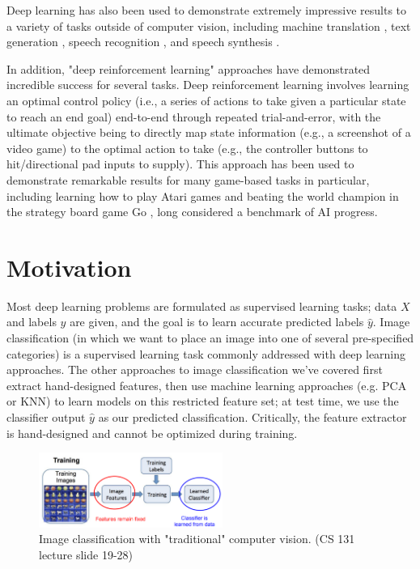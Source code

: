 \documentclass{article}
\begin{document}
Deep learning has also been used to demonstrate extremely impressive results to a variety of tasks outside of computer vision, including machine translation \cite{translation}, text generation \cite{textgen}, speech recognition \cite{sprec}, and speech synthesis \cite{spsyn}.

In addition, "deep reinforcement learning" approaches have demonstrated incredible success for several tasks. Deep reinforcement learning involves learning an optimal control policy (i.e., a series of actions to take given a particular state to reach an end goal) end-to-end through repeated trial-and-error, with the ultimate objective being to directly map state information (e.g., a screenshot of a video game) to the optimal action to take  (e.g., the controller buttons to hit/directional pad inputs to supply). This approach has been used to demonstrate remarkable results for many game-based tasks in particular, including learning how to play  Atari games \cite{atari} and beating the world champion in the strategy board game Go \cite{go}, long considered a benchmark of AI progress.

\section{Motivation}
Most deep learning problems are formulated as supervised learning tasks; data $X$ and labels $y$ are given, and the goal is to learn accurate predicted labels $\hat{y}$. Image classification (in which we want to place an image into one of several pre-specified categories) is a supervised learning task commonly addressed with deep learning approaches. The other approaches to image classification we've covered first extract hand-designed features, then use machine learning approaches (e.g. PCA or KNN) to learn models on this restricted feature set; at test time, we use the classifier output $\hat{y}$ as our predicted classification. Critically, the feature extractor is hand-designed and cannot be optimized during training.
\begin{figure}[h]
\includegraphics[width=6cm]{Conventional_schematic.png}
\centering
\caption{Image classification with "traditional" computer vision. (CS 131 lecture slide 19-28)}
\end{figure}
\end{document}

